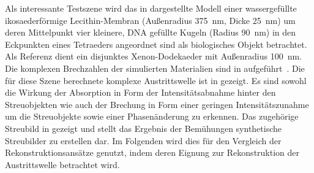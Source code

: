 Als interessante Testszene wird das in  dargestellte Modell einer wassergefüllte ikosaederförmige Lecithin-Membran (Außenradius \SI{375}{nm}, Dicke \SI{25}{nm}) um deren Mittelpunkt vier kleinere, DNA gefüllte Kugeln (Radius \SI{90}{nm}) in den Eckpunkten eines Tetraeders angeordnet sind als biologisches Objekt betrachtet. Als Referenz dient ein disjunktes Xenon-Dodekaeder mit Außenradius \SI{100}{nm}. Die komplexen Brechzahlen der simulierten Materialien sind in  aufgeführt~\cite{henke,bergh2008,milo2015}. Die für diese Szene berechnete komplexe Austrittswelle ist in  gezeigt. Es sind sowohl die Wirkung der Absorption in Form der Intensitätsabnahme hinter den Streuobjekten wie auch der Brechung in Form einer geringen Intensitätszunahme um die Streuobjekte sowie einer Phasenänderung zu erkennen. Das zugehörige Streubild in  gezeigt und stellt das Ergebnis der Bemühungen synthetische Streubilder zu erstellen dar. Im Folgenden wird dies für den Vergleich der Rekonstruktionsansätze genutzt, indem deren Eignung zur Rekonstruktion der Austrittswelle betrachtet wird.

